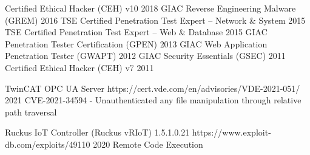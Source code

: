     \itemizeCVEnd



        \cvItem
            {Certified Ethical Hacker (CEH) v10}
            {}
            {2018}
            {}
            {}
        \cvItem
            {GIAC Reverse Engineering Malware (GREM)}
            {}
            {2016}
            {}
            {}
        \cvItem
            {TSE Certified Penetration Test Expert – Network \& System}
            {}
            {2015}
            {}
            {}
        \cvItem
            {TSE Certified Penetration Test Expert – Web \& Database}
            {}
            {2015}
            {}
            {}
        \cvItem
            {GIAC Penetration Tester Certification (GPEN)}
            {}
            {2013}
            {}
            {}
        \cvItem
            {GIAC Web Application Penetration Tester (GWAPT)}
            {}
            {2012}
            {}
            {}
        \cvItem
            {GIAC Security Essentials (GSEC)}
            {}
            {2011}
            {}
            {}
        \cvItem
            {Certified Ethical Hacker (CEH) v7}
            {}
            {2011}
            {}
            {}
  
    \itemizeCVEnd



        \cvItem
            {TwinCAT OPC UA Server}
            {https://cert.vde.com/en/advisories/VDE-2021-051/}
            {2021}
            {CVE-2021-34594 - Unauthenticated any file manipulation through relative path traversal}
            {}

    \itemizeCVEnd



        \cvItem
            {Ruckus IoT Controller (Ruckus vRIoT) 1.5.1.0.21}
            {https://www.exploit-db.com/exploits/49110}
            {2020}
            {Remote Code Execution}
            {}
            
    \itemizeCVEnd



